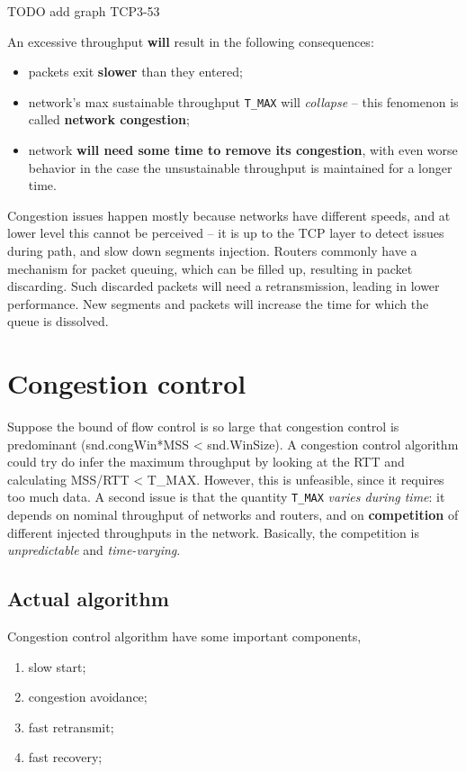 \documentclass[a4paper, 11pt]{report}
\begin{document}
TODO add graph TCP3-53

An excessive throughput \textbf{will} result in the following consequences:
\begin{itemize}
    \item packets exit \textbf{slower} than they entered;
    \item network's max sustainable throughput \texttt{T\_MAX} will
        \emph{collapse} \--- this fenomenon is called \textbf{network
        congestion};
    \item network \textbf{will need some time to remove its congestion},
        with even worse behavior in the case the unsustainable throughput is
        maintained for a longer time.
\end{itemize}

Congestion issues happen mostly because networks have different speeds, and at
lower level this cannot be perceived \--- it is up to the TCP layer to detect
issues during path, and slow down segments injection. Routers commonly have a
mechanism for packet queuing, which can be filled up, resulting in packet
discarding. Such discarded packets will need a retransmission, leading in lower
performance. New segments and packets will increase the time for which the
queue is dissolved.

\section{Congestion control}

Suppose the bound of flow control is so large that congestion control is
predominant (snd.congWin*MSS < snd.WinSize). A congestion control algorithm
could try do infer the maximum throughput by looking at the RTT and calculating
MSS/RTT < T\_MAX. However, this is unfeasible, since it requires too much data.
A second issue is that the quantity \texttt{T\_MAX} \emph{varies during time}:
it depends on nominal throughput of networks and routers, and on
\textbf{competition} of different injected throughputs in the network.
Basically, the competition is \emph{unpredictable} and \emph{time-varying}.

\subsection{Actual algorithm}

Congestion control algorithm have some important components,
\begin{enumerate}
	\item slow start;
    \item congestion avoidance;
    \item fast retransmit;
    \item fast recovery;
\end{enumerate}
\end{document}

